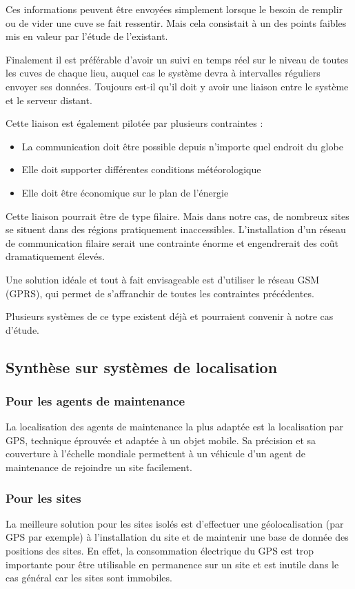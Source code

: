 \documentclass{article}
\begin{document}
Ces informations peuvent être envoyées simplement lorsque le besoin de
remplir ou de vider une cuve se fait ressentir. Mais cela consistait à
un des points faibles mis en valeur par l’étude de l’existant.

Finalement il est préférable d’avoir un suivi en temps réel sur le
niveau de toutes les cuves de chaque lieu, auquel cas le système devra
à intervalles réguliers envoyer ses données. Toujours est-il qu’il doit
y avoir une liaison entre le système et le serveur distant. 

Cette liaison est également pilotée par plusieurs contraintes :

\begin{itemize}
\item La communication doit être possible depuis n’importe quel endroit
du globe
\item Elle doit supporter différentes conditions météorologique
\item Elle doit être économique sur le plan de l’énergie
\end{itemize}

Cette liaison pourrait être de type filaire. Mais dans notre cas, de
nombreux sites se situent dans des régions pratiquement inaccessibles.
L’installation d’un réseau de communication filaire serait une
contrainte énorme et engendrerait des coût dramatiquement élevés. 

Une solution idéale et tout à fait envisageable est d’utiliser le réseau
GSM (GPRS), qui permet de s’affranchir de toutes les contraintes
précédentes.

Plusieurs systèmes de ce type existent déjà et pourraient convenir à
notre cas d’étude.

\subsection{Synthèse sur systèmes de localisation}
\subsubsection{Pour les agents de maintenance}
La localisation des agents de maintenance la plus adaptée est la
localisation par GPS, technique éprouvée et adaptée à un objet mobile.
Sa précision et sa couverture à l’échelle mondiale permettent à un
véhicule d’un agent de maintenance de rejoindre un site facilement.

\subsubsection{Pour les sites}
La meilleure solution pour les sites isolés est d’effectuer une
géolocalisation (par GPS par exemple) à l’installation du site et de
maintenir une base de donnée des positions des sites. En effet, la
consommation électrique du GPS est trop importante pour être utilisable
en permanence sur un site et est inutile dans le cas général car les
sites sont immobiles.
\end{document}
